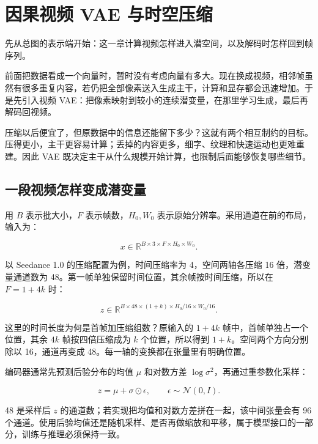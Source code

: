 \chapter{因果视频 VAE 与时空压缩}\label{seedance-m01}

先从总图的表示端开始：这一章计算视频怎样进入潜空间，以及解码时怎样回到帧序列。

前面把数据看成一个向量时，暂时没有考虑向量有多大。现在换成视频，相邻帧虽然有很多重复内容，若仍把全部像素送入生成主干，计算和显存都会迅速增加。于是先引入视频 VAE：把像素映射到较小的连续潜变量，在那里学习生成，最后再解码回视频。

压缩以后便宜了，但原数据中的信息还能留下多少？这就有两个相互制约的目标。压得更小，主干更容易计算；丢掉的内容更多，细字、纹理和快速运动也更难重建。因此 VAE 既决定主干从什么规模开始计算，也限制后面能够恢复哪些细节。

\section{一段视频怎样变成潜变量}\label{seedance-m01-ux4e00ux6bb5ux89c6ux9891ux600eux6837ux53d8ux6210ux6f5cux53d8ux91cf}

用 \(B\) 表示批大小，\(F\) 表示帧数，\(H_0,W_0\) 表示原始分辨率。采用通道在前的布局，输入为：

\[
x\in\mathbb{R}^{B\times3\times F\times H_0\times W_0}.
\]

以 Seedance 1.0 的压缩配置为例，时间压缩率为 4，空间两轴各压缩 16 倍，潜变量通道数为 48。第一帧单独保留时间位置，其余帧按时间压缩，所以在 \(F=1+4k\) 时：

\[
z\in\mathbb{R}^{B\times48\times(1+k)\times H_0/16\times W_0/16}.
\]

这里的时间长度为何是首帧加压缩组数？原输入的 \(1+4k\) 帧中，首帧单独占一个位置，其余 \(4k\) 帧按四倍压缩成为 \(k\) 个位置，所以得到 \(1+k\)。空间两个方向分别除以 16，通道再变成 48。每一轴的变换都在张量里有明确位置。

编码器通常先预测后验分布的均值 \(\mu\) 和对数方差 \(\log\sigma^2\)，再通过重参数化采样：

\[
z=\mu+\sigma\odot\epsilon,\qquad \epsilon\sim\mathcal{N}(0,I).
\]

48 是采样后 \(z\) 的通道数；若实现把均值和对数方差拼在一起，该中间张量会有 96 个通道。使用后验均值还是随机采样、是否再做缩放和平移，属于模型接口的一部分，训练与推理必须保持一致。


